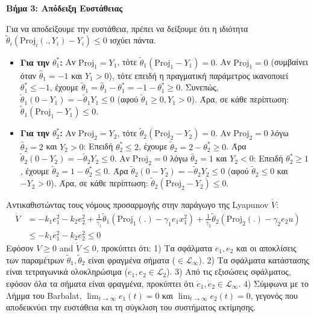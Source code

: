 \documentclass[a4paper,11pt]{article}
\begin{document}
\begin{answer}
\textbf{Βήμα 3: Απόδειξη Ευστάθειας}

Για να αποδείξουμε την ευστάθεια, πρέπει να δείξουμε ότι η ιδιότητα $\tilde{\theta}_i (\text{Proj}_i(., Y_i) - Y_i) \le 0$ ισχύει πάντα.

\begin{itemize}
    \item \textbf{Για την $\theta_1^*$:} 
    Αν $\text{Proj}_1 = Y_1$, τότε $\tilde{\theta}_1 (\text{Proj}_1 - Y_1) = 0$.
    Αν $\text{Proj}_1 = 0$ (συμβαίνει όταν $\hat{\theta}_1 = -1$ και $Y_1 > 0$), τότε επειδή η πραγματική παράμετρος ικανοποιεί $\theta_1^* \le -1$, έχουμε $\tilde{\theta}_1 = \hat{\theta}_1 - \theta_1^* = -1 - \theta_1^* \ge 0$.
    Συνεπώς, $\tilde{\theta}_1 (0 - Y_1) = -\tilde{\theta}_1 Y_1 \le 0$ (αφού $\tilde{\theta}_1 \ge 0, Y_1 > 0$).
    Άρα, σε κάθε περίπτωση: $\tilde{\theta}_1 (\text{Proj}_1 - Y_1) \le 0$.

    \item \textbf{Για την $\theta_2^*$:}
    Αν $\text{Proj}_2 = Y_2$, τότε $\tilde{\theta}_2 (\text{Proj}_2 - Y_2) = 0$.
    Αν $\text{Proj}_2 = 0$ λόγω $\hat{\theta}_2 = 2$ και $Y_2 > 0$: Επειδή $\theta_2^* \le 2$, έχουμε $\tilde{\theta}_2 = 2 - \theta_2^* \ge 0$. Άρα $\tilde{\theta}_2 (0 - Y_2) = -\tilde{\theta}_2 Y_2 \le 0$.
    Αν $\text{Proj}_2 = 0$ λόγω $\hat{\theta}_2 = 1$ και $Y_2 < 0$: Επειδή $\theta_2^* \ge 1$, έχουμε $\tilde{\theta}_2 = 1 - \theta_2^* \le 0$. Άρα $\tilde{\theta}_2 (0 - Y_2) = -\tilde{\theta}_2 Y_2 \le 0$ (αφού $\tilde{\theta}_2 \le 0$ και $-Y_2 > 0$).
    Άρα, σε κάθε περίπτωση: $\tilde{\theta}_2 (\text{Proj}_2 - Y_2) \le 0$.
\end{itemize}

Αντικαθιστώντας τους νόμους προσαρμογής στην παράγωγο της Lyapunov $\dot{V}$:
\begin{align*}
    \dot{V} &= -k_1 e_1^2 - k_2 e_2^2 + \frac{1}{\gamma_1} \tilde{\theta}_1 \left( \text{Proj}_1(.) - \gamma_1 e_1 x_1^2 \right) + \frac{1}{\gamma_2} \tilde{\theta}_2 \left( \text{Proj}_2(.) - \gamma_2 e_2 u \right) \\
    &\le -k_1 e_1^2 - k_2 e_2^2 \le 0
\end{align*}
Εφόσον $V \ge 0$ and $\dot{V} \le 0$, προκύπτει ότι:
1) Τα σφάλματα $e_1, e_2$ και οι αποκλίσεις των παραμέτρων $\tilde{\theta}_1, \tilde{\theta}_2$ είναι φραγμένα σήματα ($\in \mathcal{L}_\infty$).
2) Τα σφάλματα κατάστασης είναι τετραγωνικά ολοκληρώσιμα ($e_1, e_2 \in \mathcal{L}_2$).
3) Από τις εξισώσεις σφάλματος, εφόσον όλα τα σήματα είναι φραγμένα, προκύπτει ότι $\dot{e}_1, \dot{e}_2 \in \mathcal{L}_\infty$.
4) Σύμφωνα με το Λήμμα του Barbalat, $\lim_{t \to \infty} e_1(t) = 0$ και $\lim_{t \to \infty} e_2(t) = 0$, γεγονός που αποδεικνύει την ευστάθεια και τη σύγκλιση του συστήματος εκτίμησης.
\end{answer}
\end{document}
